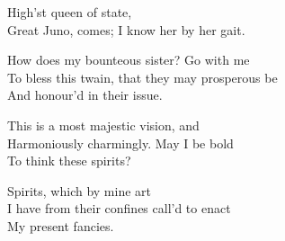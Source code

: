 \begin{verse_speech}[Ceres] 
High'st queen of state,\\
Great Juno, comes; I know her by her gait.
\end{verse_speech}


\begin{verse_speech}[Juno] 
How does my bounteous sister? Go with me\\
To bless this twain, that they may prosperous be\\
And honour'd in their issue.
\end{verse_speech}


\begin{verse_speech}[Juno]
	\begin{song}
\end{song}
\end{verse_speech}

\begin{verse_speech}[Ceres] 
	\begin{song}
\end{song}
\end{verse_speech}


\begin{verse_speech}[Ferdinand] 
This is a most majestic vision, and\\
Harmoniously charmingly. May I be bold\\
To think these spirits?
\end{verse_speech}


\begin{verse_speech}[Prospero] 
Spirits, which by mine art\\
I have from their confines call'd to enact\\
My present fancies.
\end{verse_speech}

